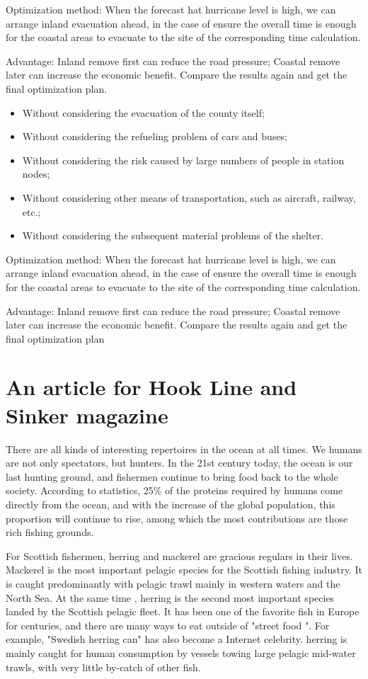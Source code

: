 \documentclass{mcmthesis}
\begin{document}
Optimization method: When the forecast hat hurricane level is high, we can arrange inland evacuation ahead, in the case of ensure the overall time is enough for the coastal areas to evacuate to the site of the corresponding time calculation.

Advantage: Inland remove first can reduce the road pressure; Coastal remove later can increase the economic benefit. Compare the results again and get the final optimization plan.
\begin{itemize}
  \item Without considering the evacuation of the county itself;
  \item Without considering the refueling problem of cars and buses;
  \item Without considering the risk caused by large numbers of people in station nodes;
  \item Without considering other means of transportation, such as aircraft, railway, etc.;
  \item Without considering the subsequent material problems of the shelter.
\end{itemize}

Optimization method: When the forecast hat hurricane level is high, we can arrange inland evacuation ahead, in the case of ensure the overall time is enough for the coastal areas to evacuate to the site of the corresponding time calculation.

Advantage: Inland remove first can reduce the road pressure; Coastal remove later can increase the economic benefit. Compare the results again and get the final optimization plan


\section{An article for Hook Line and Sinker magazine}
There are all kinds of interesting repertoires in the ocean at all times. We humans are not only spectators, but hunters. In the 21st century today, the ocean is our last hunting ground, and fishermen continue to bring food back to the whole society. According to statistics, 25\% of the proteins required by humans come directly from the ocean, and with the increase of the global population, this proportion will continue to rise, among which the most contributions are those rich fishing grounds.

For Scottish fishermen, herring and mackerel are gracious regulars in their lives. Mackerel is the most important pelagic species for the Scottish fishing industry. It is caught predominantly with pelagic trawl mainly in western waters and the North Sea.
At the same time , herring is the second most important species landed by the Scottish pelagic fleet. It has been one of the favorite fish in Europe for centuries, and there are many ways to eat outside of "street food ". For example, "Swedish herring can" has also become a Internet celebrity. herring is mainly caught for human consumption by vessels towing large pelagic mid-water trawls, with very little by-catch of other fish. 
\end{document}
